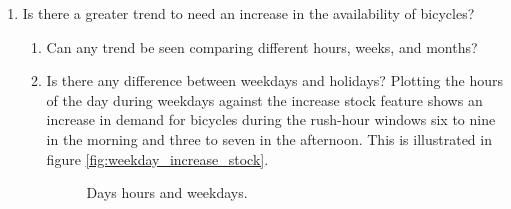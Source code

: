 \documentclass{article}
\begin{document}
\begin{enumerate}
\item Is there a greater trend to need an increase in the availability of bicycles?
\begin{enumerate}
\item Can any trend be seen comparing different hours, weeks, and months?
\item Is there any difference between weekdays and holidays?
Plotting the hours of the day during weekdays against the increase stock feature shows an increase in demand for bicycles during the rush-hour windows six to nine in the morning and three to seven in the afternoon. This is illustrated in figure \ref{fig:weekday_increase_stock}.

\begin{figure}[htb!]
\caption{Days hours and weekdays.}
\label{fig:H}
\hfill
\end{figure}



\end{enumerate}
\end{enumerate}
\end{document}
